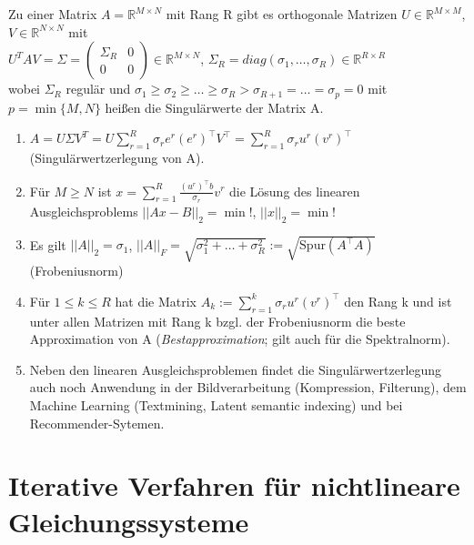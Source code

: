 \documentclass[a4paper]{article}
\begin{document}
Zu einer Matrix $A = \mathbb{R}^{M \times N}$ mit Rang R gibt es orthogonale
Matrizen $U \in \mathbb{R}^{M \times M}$, $V \in \mathbb{R}^{N \times N}$ mit
\\
$U^T A V = \Sigma = \begin{pmatrix}\Sigma_R & 0 \\ 0 & 0\end{pmatrix} \in
\mathbb{R}^{M \times N}$,
\hspace{2em}
$\Sigma_R = diag(\sigma_1, \dots, \sigma_R) \in \mathbb{R}^{R \times R}$
\\
wobei $\Sigma_R$ regulär und $\sigma_1 \ge \sigma_2 \ge \dots \ge \sigma_R >
\sigma_{R + 1} = \dots = \sigma_p = 0$ mit $p = \min\{M, N\}$ heißen die
Singulärwerte der Matrix A.

\begin{enumerate}
    \renewcommand\labelenumi{\theenumi)}
    \item $A = U \Sigma V^T = U \sum\limits_{r = 1}^R \sigma_r e^r
    (e^r)^\intercal V^\intercal = \sum\limits_{r = 1}^R \sigma_r u^r
    (v^r)^\intercal$ (Singulärwertzerlegung von A).

    \item Für $M \ge N$ ist $x = \sum\limits_{r = 1}^R \frac{(u^r)^\intercal
    b}{\sigma_r} v^r$ die Lösung des linearen Ausgleichsproblems $||Ax - B||_2 =
    \min!$, $||x||_2 = \min!$

    \item Es gilt $||A||_2 = \sigma_1$, \hspace{2em} $||A||_F = \sqrt{\sigma_1^2
    + \dots + \sigma_R^2} := \sqrt{\textrm{Spur}(A^\intercal A)}$
    (Frobeniusnorm)
 
    \item Für $1 \le k \le R$ hat die Matrix $A_k := \sum\limits_{r = 1}^k
    \sigma_r u^r (v^r)^\intercal$ den Rang k und ist unter allen Matrizen mit
    Rang k bzgl. der Frobeniusnorm die beste Approximation von A
    (\emph{Bestapproximation}; gilt auch für die Spektralnorm).

    \item Neben den linearen Ausgleichsproblemen findet die
    Singulärwertzerlegung auch noch Anwendung in der Bildverarbeitung
    (Kompression, Filterung), dem Machine Learning (Textmining, Latent semantic
    indexing) und bei Recommender-Sytemen.
\end{enumerate}

\section{Iterative Verfahren für nichtlineare Gleichungssysteme}
\end{document}
